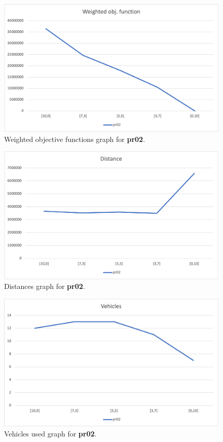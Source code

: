 \begin{figure}[H]
    \centering
    \includegraphics[height=0.25\textheight]{../graphs/pr02-wobjf.png}
    \caption{Weighted objective functions graph for \textbf{pr02}.}
\end{figure}

\begin{figure}[H]
    \centering
    \includegraphics[height=0.25\textheight]{../graphs/pr02-distance.png}
    \caption{Distances graph for \textbf{pr02}.}
\end{figure}

\begin{figure}[H]
    \centering
    \includegraphics[height=0.25\textheight]{../graphs/pr02-vehicles.png}
    \caption{Vehicles used graph for \textbf{pr02}.}
\end{figure}

\newpage
